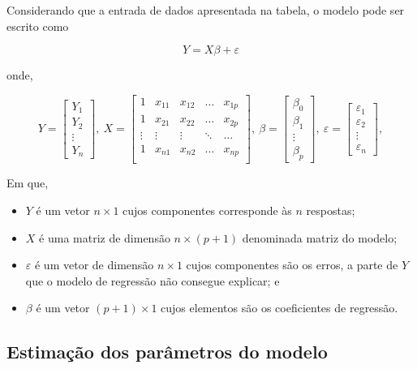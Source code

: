 \documentclass[
]{book}
\providecommand{\tightlist}{%
  \setlength{\itemsep}{0pt}\setlength{\parskip}{0pt}}
\begin{document}
Considerando que a entrada de dados apresentada na tabela, o modelo pode ser escrito como

\[Y=X\beta+\varepsilon\]

onde,

\[Y = \left[\begin{array}{r}
Y_1       \\
Y_2    \\
\vdots \\
Y_n    \end{array}\right], ~ X = \left[\begin{array}{rrrrr}
1 & x_{11} & x_{12} & \ldots & x_{1p} \\
1 & x_{21} & x_{22} & \ldots & x_{2p} \\
\vdots & \vdots & \vdots & \ddots & \ldots \\
1 & x_{n1} & x_{n2} & \ldots & x_{np} \\
\end{array}\right], ~ \beta = \left[\begin{array}{r}
\beta_0       \\
\beta_1    \\
\vdots \\
\beta_p    \end{array}\right], ~ \varepsilon = \left[\begin{array}{r}
\varepsilon_1       \\
\varepsilon_2    \\
\vdots \\
\varepsilon_n \end{array}\right],\]

Em que,

\begin{itemize}
\tightlist
\item
  \(Y\) é um vetor \(n\times 1\) cujos componentes corresponde às \(n\) respostas;
\item
  \(X\) é uma matriz de dimensão \(n\times (p+1)\) denominada matriz do modelo;
\item
  \(\varepsilon\) é um vetor de dimensão \(n\times 1\) cujos componentes são os erros, a parte de \(Y\) que o modelo de regressão não consegue explicar; e
\item
  \(\beta\) é um vetor \((p+1)\times 1\) cujos elementos são os coeficientes de regressão.
\end{itemize}

\hypertarget{estimauxe7uxe3o-dos-paruxe2metros-do-modelo}{%
\subsection{Estimação dos parâmetros do modelo}\label{estimauxe7uxe3o-dos-paruxe2metros-do-modelo}}
\end{document}
